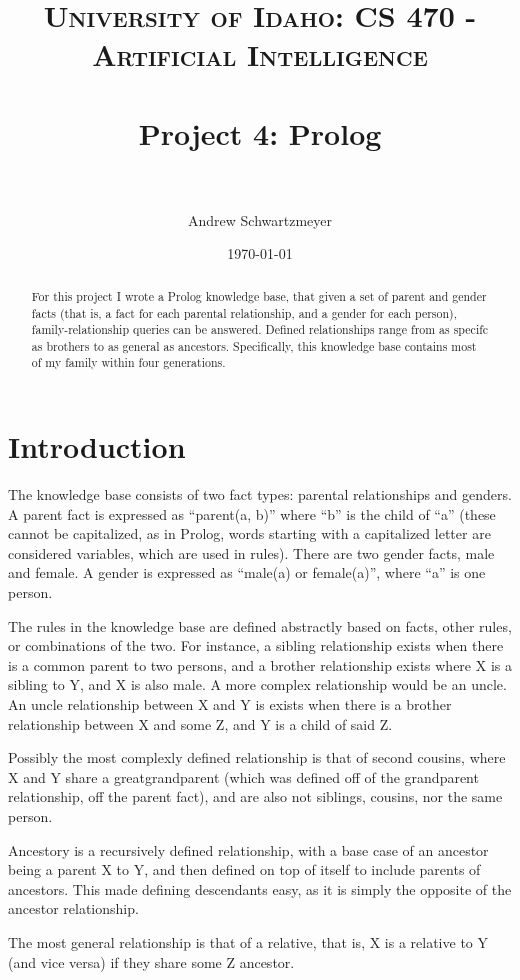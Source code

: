 \documentclass[12pt, article]{scrartcl}
\title{	
\normalfont \normalsize 
\textsc{University of Idaho: CS 470 - Artificial Intelligence} \\ [25pt]
\horrule{0.5pt} \\[0.4cm]
\huge Project 4: Prolog\\
\horrule{2pt} \\[0.5cm]
}
\author{Andrew Schwartzmeyer}
\date{\normalsize\today}
\begin{document}
\maketitle 
\begin{abstract}
For this project I wrote a Prolog knowledge base, that given a set of parent and gender facts (that is, a fact for each parental relationship, and a gender for each person), family-relationship queries can be answered. Defined relationships range from as specifc as brothers to as general as ancestors. Specifically, this knowledge base contains most of my family within four generations.
\end{abstract}
\pagebreak
\section{Introduction}
The knowledge base consists of two fact types: parental relationships and genders. A parent fact is expressed as ``parent(a, b)'' where ``b'' is the child of ``a'' (these cannot be capitalized, as in Prolog, words starting with a capitalized letter are considered variables, which are used in rules). There are two gender facts, male and female. A gender is expressed as ``male(a) or female(a)'', where ``a'' is one person.

The rules in the knowledge base are defined abstractly based on facts, other rules, or combinations of the two. For instance, a sibling relationship exists when there is a common parent to two persons, and a brother relationship exists where X is a sibling to Y, and X is also male. A more complex relationship would be an uncle. An uncle relationship between X and Y is exists when there is a brother relationship between X and some Z, and Y is a child of said Z.

Possibly the most complexly defined relationship is that of second cousins, where X and Y share a greatgrandparent (which was defined off of the grandparent relationship, off the parent fact), and are also not siblings, cousins, nor the same person.

Ancestory is a recursively defined relationship, with a base case of an ancestor being a parent X to Y, and then defined on top of itself to include parents of ancestors. This made defining descendants easy, as it is simply the opposite of the ancestor relationship.

The most general relationship is that of a relative, that is, X is a relative to Y (and vice versa) if they share some Z ancestor.
\end{document}
